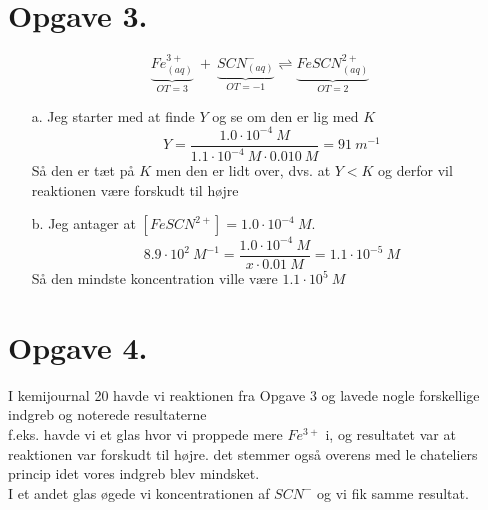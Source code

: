 \documentclass[12pt]{article}
\begin{document}
\section*{Opgave 3.}
$$\underbrace{Fe^{3+}_{(aq)}}_{OT=3} \ + \
\underbrace{SCN^{-}_{(aq)}}_{OT=-1} \rightleftharpoons
\underbrace{FeSCN^{2+}_{(aq)}}_{OT=2}$$
\begin{enumerate}
  \item[a.] Jeg starter med at finde $Y$ og se om den er lig med $K$
  $$Y=\frac{1.0 \cdot 10^{-4} \ M}{1.1 \cdot 10^{-4} \ M \cdot 0.010 \ M}=91 \ m^{-1}$$
  Så den er tæt på $K$ men den er lidt over, dvs. at $Y<K$ og derfor vil reaktionen være forskudt til højre

  \item[b.] Jeg antager at $[FeSCN^{2+}]=1.0 \cdot 10^{-4} \ M$.
  $$8.9 \cdot 10^{2} \ M^{-1}=\frac{1.0 \cdot 10^{-4} \ M}{x \cdot 0.01 \ M}=1.1 \cdot 10^{-5} \ M$$
  Så den mindste koncentration ville være $1.1 \cdot 10^{5} \ M$
\end{enumerate}

\section*{Opgave 4.}
I kemijournal 20 havde vi reaktionen fra Opgave 3 og lavede nogle forskellige indgreb og noterede resultaterne\\
f.eks. havde vi et glas hvor vi proppede mere $Fe^{3+}$ i, og resultatet var at reaktionen var forskudt til højre.
det stemmer også overens med le chateliers princip idet vores indgreb blev mindsket.\\
I et andet glas øgede vi koncentrationen af $SCN^{-}$ og vi fik samme resultat.
\end{document}
